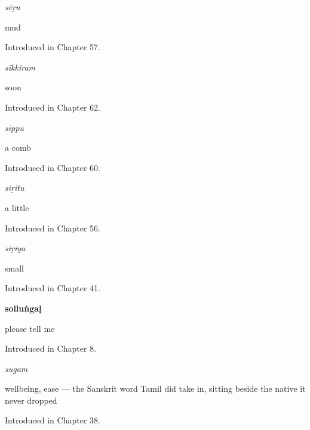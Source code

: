 \noindent\begin{minipage}[t]{\linewidth}
\raggedright
\textbf{}\enspace\emph{sēṟu}\par
\small mud\par
\footnotesize Introduced in Chapter 57.
\end{minipage}\par\medskip

\noindent\begin{minipage}[t]{\linewidth}
\raggedright
\textbf{}\enspace\emph{sīkkiram}\par
\small soon\par
\footnotesize Introduced in Chapter 62.
\end{minipage}\par\medskip

\noindent\begin{minipage}[t]{\linewidth}
\raggedright
\textbf{}\enspace\emph{sīppu}\par
\small a comb\par
\footnotesize Introduced in Chapter 60.
\end{minipage}\par\medskip

\noindent\begin{minipage}[t]{\linewidth}
\raggedright
\textbf{}\enspace\emph{siṟitu}\par
\small a little\par
\footnotesize Introduced in Chapter 56.
\end{minipage}\par\medskip

\noindent\begin{minipage}[t]{\linewidth}
\raggedright
\textbf{}\enspace\emph{siṟiya}\par
\small small\par
\footnotesize Introduced in Chapter 41.
\end{minipage}\par\medskip

\noindent\begin{minipage}[t]{\linewidth}
\raggedright
\textbf{solluṅgaḷ}\par
\small please tell me\par
\footnotesize Introduced in Chapter 8.
\end{minipage}\par\medskip

\noindent\begin{minipage}[t]{\linewidth}
\raggedright
\textbf{}\enspace\emph{sugam}\par
\small wellbeing, ease — the Sanskrit word Tamil did take in, sitting beside the native  it never dropped\par
\footnotesize Introduced in Chapter 38.
\end{minipage}\par\medskip

